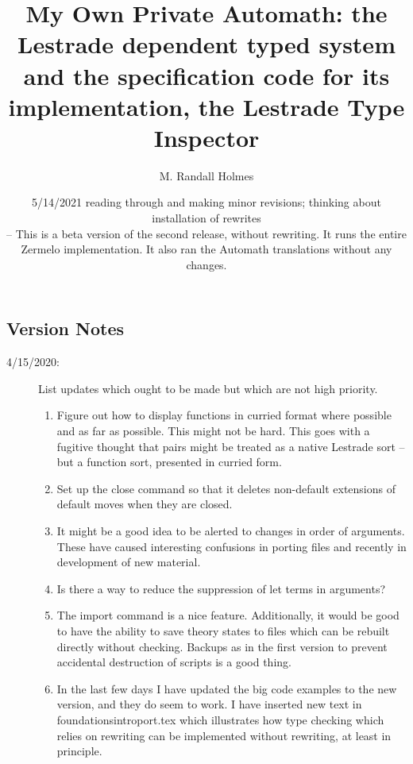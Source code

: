\documentclass[12pt]{article}
\title{My Own Private Automath:  the Lestrade dependent typed system and the specification code for its implementation, the Lestrade Type Inspector}
\author{M. Randall Holmes}
\date{5/14/2021 reading through and making minor revisions;  thinking about installation of rewrites \\

 -- This is a beta version of the second release, without rewriting.  It runs the entire  Zermelo implementation. It also ran the Automath translations without any changes.}
\begin{document}
\maketitle

\tableofcontents

\newpage

\subsection{Version Notes}

\begin{description}

\item[4/15/2020:]  List updates which ought to be made but which are not high priority.

\begin{enumerate}

\item Figure out how to display functions in curried format where possible and as far as possible.  This might not be hard.  This goes with a fugitive thought that pairs
might be treated as a native Lestrade sort -- but a function sort, presented in curried form.



\item Set up the close command so that it deletes non-default extensions of default moves when they are closed.

\item It might be a good idea to be alerted to changes in order of arguments.  These have caused interesting confusions in porting files and recently in development of new material.

\item Is there a way to reduce the suppression of let terms in arguments?

\item The import command is a nice feature.  Additionally, it would be good to have the ability to save theory states to files which can be rebuilt directly without checking.  Backups as in the first version to prevent accidental destruction of scripts is a good thing.

\item In the last few days I have updated the big code examples to the new version, and they do seem to work.   I have inserted new text in foundationsintroport.tex which illustrates
how type checking which relies on rewriting can be implemented without rewriting, at least in principle.


\end{enumerate}
\end{description}
\end{document}
